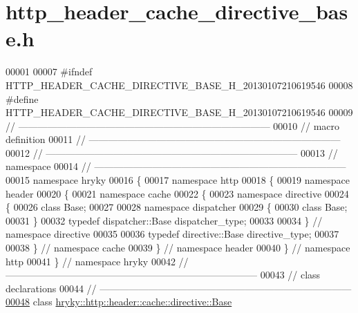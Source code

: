 \hypertarget{http__header__cache__directive__base_8h_source}{\section{http\-\_\-header\-\_\-cache\-\_\-directive\-\_\-base.\-h}
}

\begin{DoxyCode}
00001 
00007 \textcolor{preprocessor}{#ifndef HTTP\_HEADER\_CACHE\_DIRECTIVE\_BASE\_H\_20130107210619546}
00008 \textcolor{preprocessor}{}\textcolor{preprocessor}{#define HTTP\_HEADER\_CACHE\_DIRECTIVE\_BASE\_H\_20130107210619546}
00009 \textcolor{preprocessor}{}\textcolor{comment}{//
      ------------------------------------------------------------------------------}
00010 \textcolor{comment}{// macro definition}
00011 \textcolor{comment}{//
      ------------------------------------------------------------------------------}
00012 \textcolor{comment}{//
      ------------------------------------------------------------------------------}
00013 \textcolor{comment}{// namespace}
00014 \textcolor{comment}{//
      ------------------------------------------------------------------------------}
00015 \textcolor{keyword}{namespace }hryky
00016 \{
00017 \textcolor{keyword}{namespace }http
00018 \{
00019 \textcolor{keyword}{namespace }header
00020 \{
00021 \textcolor{keyword}{namespace }cache
00022 \{
00023 \textcolor{keyword}{namespace }directive
00024 \{
00026     \textcolor{keyword}{class }Base;
00027 
00028 \textcolor{keyword}{namespace }dispatcher
00029 \{
00030     \textcolor{keyword}{class }Base;
00031 \}
00032 \textcolor{keyword}{typedef} dispatcher::Base dispatcher\_type;
00033 
00034 \} \textcolor{comment}{// namespace directive}
00035 
00036 \textcolor{keyword}{typedef} directive::Base directive\_type;
00037 
00038 \} \textcolor{comment}{// namespace cache}
00039 \} \textcolor{comment}{// namespace header}
00040 \} \textcolor{comment}{// namespace http}
00041 \} \textcolor{comment}{// namespace hryky}
00042 \textcolor{comment}{//
      ------------------------------------------------------------------------------}
00043 \textcolor{comment}{// class declarations}
00044 \textcolor{comment}{//
      ------------------------------------------------------------------------------}
\hypertarget{http__header__cache__directive__base_8h_source_l00048}{}\hyperlink{classhryky_1_1http_1_1header_1_1cache_1_1directive_1_1_base}{00048} \textcolor{comment}{}\textcolor{keyword}{class }\hyperlink{classhryky_1_1http_1_1header_1_1cache_1_1directive_1_1_base}{hryky::http::header::cache::directive::Base}

\end{DoxyCode}
